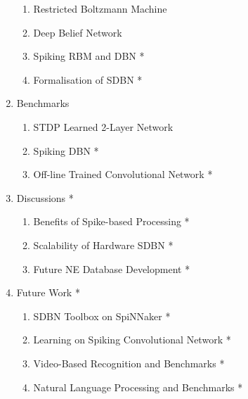 \documentclass[journal]{journal}
\begin{document}
\begin{appendices}
\begin{enumerate}
			\begin{enumerate}
				\item Restricted Boltzmann Machine  
				\item Deep Belief Network
				\item Spiking RBM and DBN *
				\item Formalisation of SDBN *
			\end{enumerate}	
		\item Benchmarks
			\begin{enumerate}
				\item STDP Learned 2-Layer Network
				\item Spiking DBN *
				\item Off-line Trained Convolutional Network *
			\end{enumerate}	
		\item Discussions *
			\begin{enumerate}
				\item Benefits of Spike-based Processing *
				\item Scalability of Hardware SDBN *
				\item Future NE Database Development *
			\end{enumerate}					
		\item Future Work *
			\begin{enumerate}
				\item SDBN Toolbox on SpiNNaker *
				\item Learning on Spiking Convolutional Network  *
				\item Video-Based Recognition and Benchmarks *
				\item Natural Language Processing and Benchmarks *
			\end{enumerate}					
	\end{enumerate}	
\end{appendices}



\end{document}
